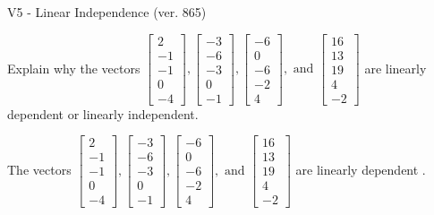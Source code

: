 \begin{exercise}
  \begin{exerciseTitle}V5 - Linear Independence (ver. 865)\end{exerciseTitle}
  \begin{exerciseStatement}
    Explain why the vectors \(\left[\begin{array}{r}
2 \\
-1 \\
-1 \\
0 \\
-4
\end{array}\right] , \left[\begin{array}{r}
-3 \\
-6 \\
-3 \\
0 \\
-1
\end{array}\right] , \left[\begin{array}{r}
-6 \\
0 \\
-6 \\
-2 \\
4
\end{array}\right] , \text{ and } \left[\begin{array}{r}
16 \\
13 \\
19 \\
4 \\
-2
\end{array}\right]\) are linearly dependent or linearly independent.	


  \end{exerciseStatement}
  \begin{exerciseAnswer}
   The vectors \(\left[\begin{array}{r}
2 \\
-1 \\
-1 \\
0 \\
-4
\end{array}\right] , \left[\begin{array}{r}
-3 \\
-6 \\
-3 \\
0 \\
-1
\end{array}\right] , \left[\begin{array}{r}
-6 \\
0 \\
-6 \\
-2 \\
4
\end{array}\right] , \text{ and } \left[\begin{array}{r}
16 \\
13 \\
19 \\
4 \\
-2
\end{array}\right]\) are 
  	 linearly dependent  .
  


  \end{exerciseAnswer}
\end{exercise}